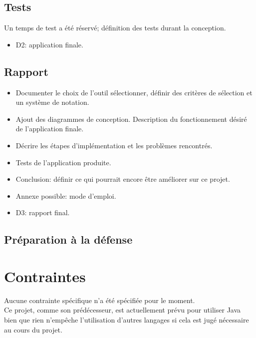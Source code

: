 \documentclass{article}
\begin{document}
  \subsection{Tests}
  Un temps de test a été réservé; définition des tests durant la conception.
  \begin{itemize}
    \item D2: application finale.
  \end{itemize}
  \subsection{Rapport}
  \begin{itemize}
    \item Documenter le choix de l'outil sélectionner, définir des critères de sélection et un système de notation.
    \item Ajout des diagrammes de conception. Description du fonctionnement désiré de l'application finale.
    \item Décrire les étapes d'implémentation et les problèmes rencontrés.
    \item Tests de l'application produite.
    \item Conclusion: définir ce qui pourrait encore être améliorer sur ce projet.
    \item Annexe possible: mode d'emploi.
    \item D3: rapport final.
  \end{itemize}
  \subsection{Préparation à la défense}

\section{Contraintes}
  Aucune contrainte spécifique n'a été spécifiée pour le moment.\\
  Ce projet, comme son prédécesseur, est actuellement prévu pour utiliser Java bien que rien n'empêche l'utilisation d'autres langages si cela est jugé nécessaire au cours du projet.

\newpage
\end{document}
